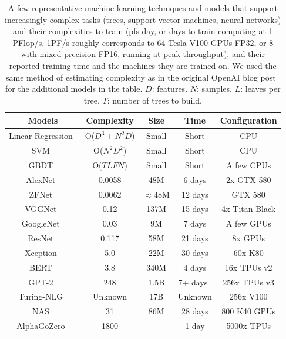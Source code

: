 \begin{table}
\centering
\footnotesize
\begin{tabular}{|c|c|c|c|c|}
  \hline
  Models & Complexity & Size & Time & Configuration \\
  \hline
  Linear Regression~\cite{seber2012linear} & O($D^3+ N^2D$) & Small & Short & CPU \\
  \hline
  SVM~\cite{wang2005support} & O($N^2D^2$) & Small & Short & CPU \\
  \hline
  GBDT~\cite{friedman2001greedy} & O($TLFN$) & Small & Short & A few CPUs \\
  \hline
  \hline 
  AlexNet~\cite{alexnet}   & 0.0058 & 48M & 6 days  & 2x GTX 580\\
  \hline
  ZFNet~\cite{ZFNet}   & 0.0062  &  $\approx$48M  & 12 days  & GTX 580\\
  \hline
  VGGNet~\cite{VGGNet}   & 0.12  & 137M & 15 days & 4x Titan Black\\
  \hline
  GoogleNet~\cite{GoogleNet}   & 0.03  & 9M & 7 days & A few GPUs\\
  \hline
  ResNet~\cite{RESNET}   & 0.117 &  58M & 21 days & 8x GPUs\\
  \hline
  Xception~\cite{Chollet_2017}  & 5.0  & 22M & 30 days & 60x K80\\
  \hline
  \hline
  BERT~\cite{bert}  & 3.8 & 340M & 4 days & 16x TPUs v2 \\
  \hline
  GPT-2~\cite{GPT2}  & 248 & 1.5B & 7+ days~\cite{gpt2Time} & 256x TPUs v3 \\
  \hline
  Turing-NLG~\cite{TuringNL61:online}  & Unknown & 17B & Unknown & 256x V100 \\
  \hline
  \hline
  NAS~\cite{zoph2016neural}  & 31 & 86M & 28 days & 800 K40 GPUs\\
  \hline
  AlphaGoZero~\cite{silver2016mastering}  & 1800 & - & 1 day & 5000x TPUs \\
  \hline
\end{tabular}
\caption{A few representative machine learning techniques and models that support increasingly complex tasks (trees, support vector machines, neural networks) and their complexities to train (pfs-day, or days to train computing at 1 PFlop/s. 1PF/s roughly corresponds to 64 Tesla V100 GPUs FP32, or 8 with mixed-precision FP16, running at peak throughput), and their reported training time and the machines they are trained on. We used the same method of estimating complexity as in the original OpenAI blog post~\cite{AIandCom3:online} for the additional models in the table. $D$: features. $N$: samples. $L$: leaves per tree. $T$: number of trees to build.}
\label{table:trend}
\end{table}

